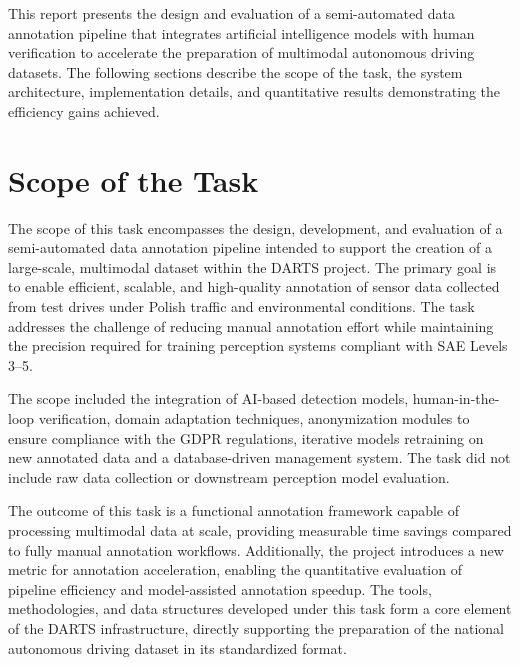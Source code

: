 \documentclass[conference]{IEEEtran}
\begin{document}


This report presents the design and evaluation of a semi-automated data annotation pipeline that integrates artificial intelligence models with human verification to accelerate the preparation of multimodal autonomous driving datasets. The following sections describe the scope of the task, the system architecture, implementation details, and quantitative results demonstrating the efficiency gains achieved.

\section{Scope of the Task}

The scope of this task encompasses the design, development, and evaluation of a semi-automated data annotation pipeline intended to support the creation of a large-scale, multimodal dataset within the DARTS project. The primary goal is to enable efficient, scalable, and high-quality annotation of sensor data collected from test drives under Polish traffic and environmental conditions. The task addresses the challenge of reducing manual annotation effort while maintaining the precision required for training perception systems compliant with SAE Levels 3–5\cite{b5}.

The scope included the integration of AI-based detection models, human-in-the-loop verification, domain adaptation techniques, anonymization modules to ensure compliance with the GDPR regulations, iterative models retraining on new annotated data and a database-driven management system. The task did not include raw data collection or downstream perception model evaluation.

The outcome of this task is a functional annotation framework capable of processing multimodal data at scale, providing measurable time savings compared to fully manual annotation workflows. Additionally, the project introduces a new metric for annotation acceleration, enabling the quantitative evaluation of pipeline efficiency and model-assisted annotation speedup. The tools, methodologies, and data structures developed under this task form a core element of the DARTS infrastructure, directly supporting the preparation of the national autonomous driving dataset in its standardized format.
\end{document}
